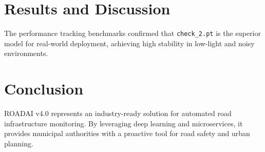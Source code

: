 \documentclass[12pt,a4paper]{report}
\begin{document}
\chapter{Results and Discussion}
The performance tracking benchmarks confirmed that \texttt{check\_2.pt} is the superior model for real-world deployment, achieving high stability in low-light and noisy environments.

\chapter{Conclusion}
ROADAI v4.0 represents an industry-ready solution for automated road infrastructure monitoring. By leveraging deep learning and microservices, it provides municipal authorities with a proactive tool for road safety and urban planning.
\end{document}
